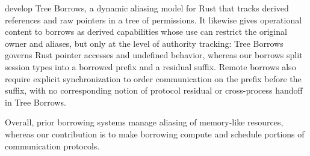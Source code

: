 \citet{DBLP:journals/pacmpl/VillaniHDJ25} develop Tree Borrows, a
dynamic aliasing model for Rust that tracks derived references and raw
pointers in a tree of permissions. It likewise gives operational
content to borrows as derived capabilities whose use can restrict the
original owner and aliases, but only at the level of authority
tracking: Tree Borrows governs Rust pointer accesses and undefined
behavior, whereas our borrows split session types into a borrowed
prefix and a residual suffix. Remote borrows also require explicit
synchronization to order communication on the prefix before the suffix,
with no corresponding notion of protocol residual or cross-process
handoff in Tree Borrows.

Overall, prior borrowing systems manage aliasing of memory-like
resources, whereas our contribution is to make borrowing compute and
schedule portions of communication protocols.


